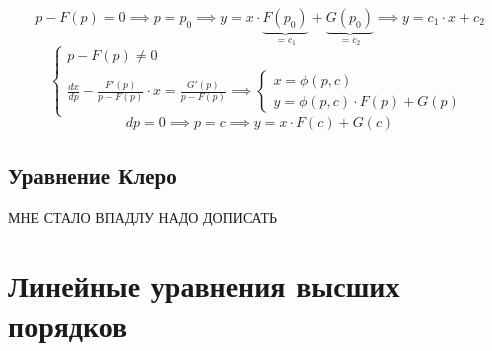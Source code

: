 \documentclass{report}
\theoremstyle{definition}
\begin{document}
\begin{equation*}
    p - F(p) = 0 \implies p = p_0 \implies y = x\cdot \underbrace{F(p_0)}_{=c_1} + \underbrace{G(p_0)}_{=c_2} \implies y = c_1 \cdot x + c_2
\end{equation*}
\begin{equation*}
    \left\{\begin{array}{l}
        p - F(p)\ne 0 \\
        \frac{dx}{dp} - \frac{F'(p)}{p - F(p)}\cdot x = \frac{G'(p)}{p - F(p)} \implies \left\{\begin{array}{l}
                                                                                                   x = \phi(p,c) \\
                                                                                                   y = \phi(p,c) \cdot F(p) + G(p)
                                                                                               \end{array}\right.
    \end{array}\right.
\end{equation*}
\begin{equation*}
    dp = 0 \implies p = c \implies y = x \cdot F(c) + G(c)
\end{equation*}

\subsection*{Уравнение Клеро}

{\Huge МНЕ СТАЛО ВПАДЛУ НАДО ДОПИСАТЬ}

\section{Линейные уравнения высших порядков}
\end{document}
